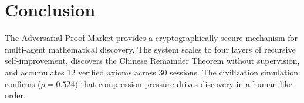 \documentclass{article}
\begin{document}
\section{Conclusion}

The Adversarial Proof Market provides a cryptographically secure mechanism
for multi-agent mathematical discovery.
The system scales to four layers of recursive self-improvement, discovers
the Chinese Remainder Theorem without supervision, and accumulates
12 verified axioms across 30 sessions.
The civilization simulation confirms ($\rho = 0.524$)
that compression pressure drives discovery in a human-like order.
\end{document}
